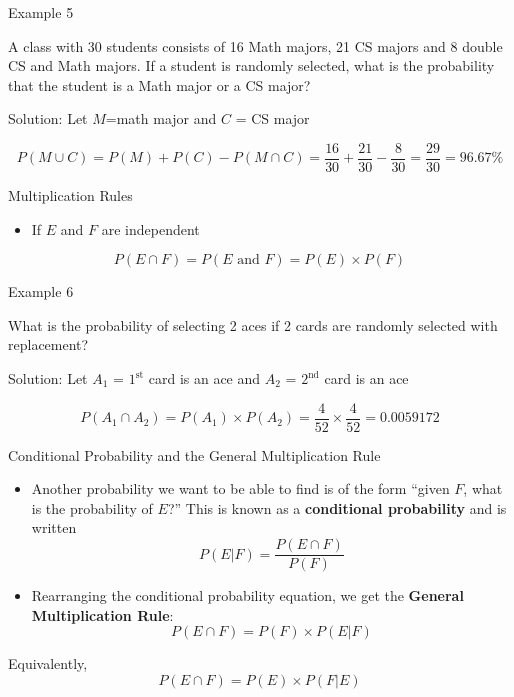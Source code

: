 \documentclass[
  ignorenonframetext,
]{beamer}
\providecommand{\tightlist}{%
  \setlength{\itemsep}{0pt}\setlength{\parskip}{0pt}}
\begin{document}
\begin{frame}{Example 5}
\label{example-5}
\begin{tcolorbox}
A class with 30 students consists of 16 Math majors, 21 CS majors and 8 double CS and Math majors. If a student is randomly selected, what is the probability that the student is a Math major or a CS major?
\end{tcolorbox}

\begin{tcolorbox}
Solution:
Let $M$=math major and $C$ = CS major

$$P(M \cup C) = P(M)+P(C)-P(M \cap C) = \frac{16}{30}+\frac{21}{30}-\frac{8}{30} = \frac{29}{30}=96.67\%$$
\end{tcolorbox}
\end{frame}

\begin{frame}{Multiplication Rules}
\label{multiplication-rules}
\begin{itemize}
\tightlist
\item
  If \(E\) and \(F\) are independent
\end{itemize}

\[P(E \cap F) =P(E \text{ and } F)= P(E)\times P(F)\]
\end{frame}

\begin{frame}{Example 6}
\label{example-6}
\begin{tcolorbox}
What is the probability of selecting 2 aces if 2 cards are randomly selected with replacement?
\end{tcolorbox}

\begin{tcolorbox}
Solution:
Let $A_1$ = $1^{\text{st}}$ card is an ace and $A_2$ = $2^{\text{nd}}$ card is an ace

$$P(A_1 \cap A_2) = P(A_1)\times P(A_2) = \frac{4}{52}\times\frac{4}{52} = 0.0059172$$
\end{tcolorbox}
\end{frame}

\begin{frame}{Conditional Probability and the General Multiplication
Rule}
\label{conditional-probability-and-the-general-multiplication-rule}
\begin{itemize}
\item
  Another probability we want to be able to find is of the form ``given
  \(F\), what is the probability of \(E\)?'' This is known as a
  \textbf{conditional probability} and is written
  \[P(E | F)=\frac{P( E \cap  F)}{P( F)}\]
\item
  Rearranging the conditional probability equation, we get the
  \textbf{General Multiplication Rule}:
  \[P(E \cap F)=P( F)\times P(E| F)\]
\end{itemize}

Equivalently, \[P(E \cap F)=P( E)\times P(F|E)\]
\end{frame}
\end{document}
